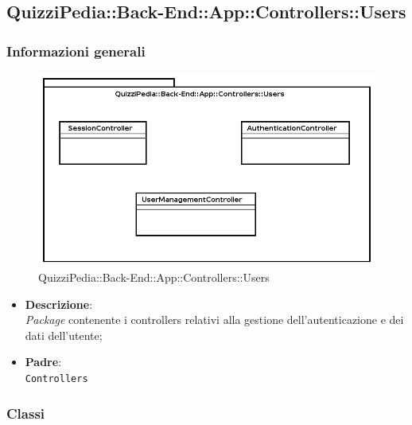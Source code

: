 \subsection{QuizziPedia::Back-End::App::Controllers::Users}
\subsubsection{Informazioni generali}
\label{QuizziPedia::Back-End::App::Controllers::Users}
\begin{figure}[ht]
	\centering
	\includegraphics[scale=0.45]{UML/Package/QuizziPedia_Back-End_App_Controllers_Users.png}
	\caption{QuizziPedia::Back-End::App::Controllers::Users}
\end{figure}
\FloatBarrier
\begin{itemize}
	\item 
	\textbf{Descrizione}:\\
	\textit{Package} contenente i controllers relativi alla gestione dell'autenticazione e dei dati dell'utente;
	\item
	\textbf{Padre}:\\
	\texttt{Controllers}
\end{itemize}	
\subsubsection{Classi}
